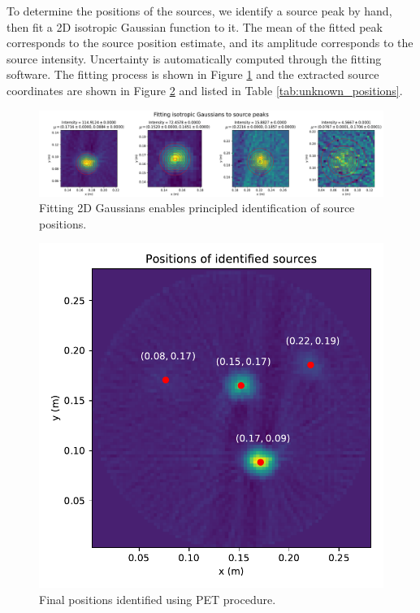 \documentclass[12pt, letterpaper]{article}
\begin{document}
To determine the positions of the sources, we identify a source peak by hand, then fit a 2D isotropic Gaussian function to it. The mean of the fitted peak corresponds to the source position estimate, and its amplitude corresponds to the source intensity. Uncertainty is automatically computed through the fitting software. The fitting process is shown in Figure \ref{fig:unknown_fitting} and the extracted source coordinates are shown in Figure \ref{fig:unknown_positions} and listed in Table \ref{tab:unknown_positions}. 

\begin{figure}
    \centering
    \includegraphics[width=1\linewidth]{experiment5/figures/unknown_fitting.pdf}
    \caption{Fitting 2D Gaussians enables principled identification of source positions. }
    \label{fig:unknown_fitting}
\end{figure}

\begin{figure}
    \centering
    \includegraphics[width=0.75\linewidth]{experiment5/figures/unknown_positions.pdf}
    \caption{Final positions identified using PET procedure. }
    \label{fig:unknown_positions}
\end{figure}
\end{document}
